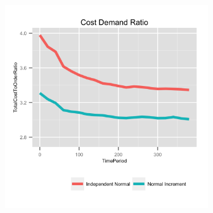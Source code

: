 \documentclass{beamer}
\begin{document}
\begin{frame}
  \includegraphics[height=3.5in]{figures/TotalCostToOrderRatio.png}
\end{frame}
\end{document}
